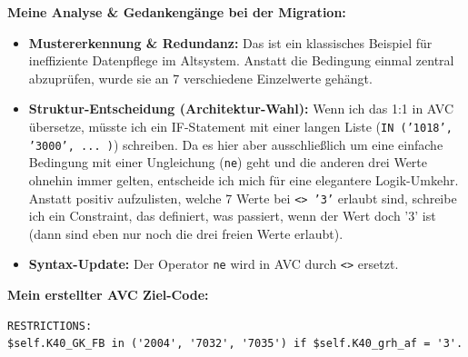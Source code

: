 \documentclass[12pt, a4paper, oneside]{book}
\begin{document}
\textbf{Meine Analyse \& Gedankengänge bei der Migration:}
\begin{itemize}
    \item \textbf{Mustererkennung \& Redundanz:} Das ist ein klassisches Beispiel für ineffiziente Datenpflege im Altsystem. Anstatt die Bedingung einmal zentral abzuprüfen, wurde sie an 7 verschiedene Einzelwerte gehängt.
    \item \textbf{Struktur-Entscheidung (Architektur-Wahl):} Wenn ich das 1:1 in AVC übersetze, müsste ich ein IF-Statement mit einer langen Liste (\texttt{IN ('1018', '3000', ... )}) schreiben. Da es hier aber ausschließlich um eine einfache Bedingung mit einer Ungleichung (\texttt{ne}) geht und die anderen drei Werte ohnehin immer gelten, entscheide ich mich für eine elegantere Logik-Umkehr. Anstatt positiv aufzulisten, welche 7 Werte bei \texttt{<> '3'} erlaubt sind, schreibe ich ein Constraint, das definiert, was passiert, wenn der Wert doch '3' ist (dann sind eben nur noch die drei freien Werte erlaubt).
    \item \textbf{Syntax-Update:} Der Operator \texttt{ne} wird in AVC durch \texttt{<>} ersetzt.
\end{itemize}

\textbf{Mein erstellter AVC Ziel-Code:}
\begin{verbatim}
RESTRICTIONS:
$self.K40_GK_FB in ('2004', '7032', '7035') if $self.K40_grh_af = '3'.
\end{verbatim}
\end{document}
